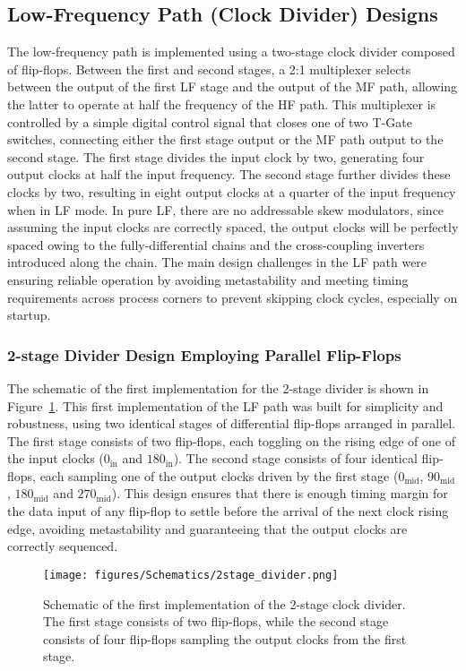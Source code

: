 \subsection{Low-Frequency Path (Clock Divider) Designs}
The low-frequency path is implemented using a two-stage clock divider composed of flip-flops.
Between the first and second stages, a 2:1 multiplexer selects between the output of the first LF stage and the output of the MF path, allowing the latter to operate at half the frequency of the HF path. This multiplexer is controlled by a simple digital control signal that closes one of two T-Gate switches, connecting either the first stage output or the MF path output to the second stage.
The first stage divides the input clock by two, generating four output clocks at half the input frequency. The second stage further divides these clocks by two, resulting in eight output clocks at a quarter of the input frequency when in LF mode.
In pure LF, there are no addressable skew modulators, since assuming the input clocks are correctly spaced, the output clocks will be perfectly spaced owing to the fully-differential chains and the cross-coupling inverters introduced along the chain. The main design challenges in the LF path were ensuring reliable operation by avoiding metastability and meeting timing requirements across process corners to prevent skipping clock cycles, especially on startup.
\subsubsection{2-stage Divider Design Employing Parallel Flip-Flops}
The schematic of the first implementation for the 2-stage divider is shown in Figure~\ref{fig:2stage_divider}.
This first implementation of the LF path was built for simplicity and robustness, using two identical stages of differential flip-flops arranged in parallel. The first stage consists of two flip-flops, each toggling on the rising edge of one of the input clocks (\(0_{\text{in}}\) and \({180}_{\text{in}}\)). The second stage consists of four identical flip-flops, each sampling one of the output clocks driven by the first stage (\(0_{\text{mid}}\), \(90_{\text{mid}}\), \(180_{\text{mid}}\) and \(270_{\text{mid}}\)). This design ensures that there is enough timing margin for the data input of any flip-flop to settle before the arrival of the next clock rising edge, avoiding metastability and guaranteeing that the output clocks are correctly sequenced. 
\begin{figure}[h]
  \centering
  \texttt{[image: figures/Schematics/2stage\_divider.png]}
  \caption{Schematic of the first implementation of the 2-stage clock divider. The first stage consists of two flip-flops, while the second stage consists of four flip-flops sampling the output clocks from the first stage.}
  \label{fig:2stage_divider}
\end{figure}
